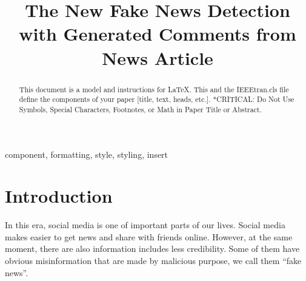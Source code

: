 \documentclass[conference]{IEEEtran}
\begin{document}
\title{The New Fake News Detection with Generated Comments from News Article%
}

\author{
\and
{}
\and
{}
\and
{}
}

\maketitle

\begin{abstract}
This document is a model and instructions for \LaTeX.
This and the IEEEtran.cls file define the components of your paper [title, text, heads, etc.]. *CRITICAL: Do Not Use Symbols, Special Characters, Footnotes, 
or Math in Paper Title or Abstract.
\end{abstract}

\begin{IEEEkeywords}
component, formatting, style, styling, insert
\end{IEEEkeywords}

\section{Introduction}
In this era, social media is one of important parts of our lives.
Social media makes easier to get news and share with friends online.
However, at the same moment, 
there are also information includes less credibility.
Some of them have obvious misinformation that are made by malicious purpose,
we call them ``fake news''.
\end{document}
